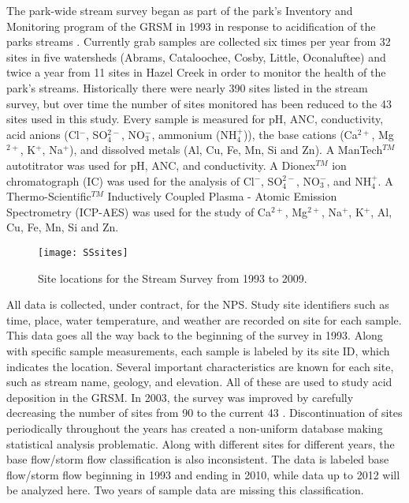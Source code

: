 The park-wide stream survey began as part of the park's Inventory and Monitoring program of the GRSM in 1993 in response to acidification of the parks streams \citep{harwell2001}.
Currently grab samples are collected six times per year from 32 sites in five watersheds (Abrams, Cataloochee, Cosby, Little, Oconaluftee) and twice a year from 11 sites in Hazel Creek in order to monitor the health of the park's streams.
Historically there were nearly 390 sites listed in the stream survey, but over time the number of sites monitored has been reduced to the 43 sites used in this study.
Every sample is  measured for pH, ANC, conductivity, acid anions (Cl$^-$, SO$_4^{2-}$, NO$_3^-$, ammonium (NH$_4^+$)), the base cations (Ca$^{2+}$, Mg$^{2+}$, K$^+$, Na$^+$), and dissolved metals (Al, Cu, Fe, Mn, Si and Zn).  
A ManTech$^{TM}$ autotitrator was used for pH, ANC, and conductivity.  
A Dionex$^{TM}$ ion chromatograph (IC) was used for the analysis of Cl$^-$, SO$_4^{2-}$, NO$_3^-$, and NH$_4^+$.  
A Thermo-Scientific$^{TM}$ Inductively Coupled Plasma - Atomic Emission Spectrometry (ICP-AES) was used for the study of Ca$^{2+}$, Mg$^{2+}$, Na$^+$, K$^+$, Al, Cu, Fe, Mn, Si and Zn.

\begin{figure}[h!]
  \centering
  \texttt{[image: SSsites]}\\
  \caption{Site locations for the Stream Survey from 1993 to 2009. }\label{fig:SSsites}
\end{figure}

All data is collected, under contract, for the NPS.
Study site identifiers such as time, place, water temperature, and weather are recorded on site for each sample.
This data goes all the way back to the beginning of the survey in 1993.
Along with specific sample measurements, each sample is labeled by its site ID, which indicates the location.
Several important characteristics are known for each site, such as stream name, geology, and elevation.
All of these are used to study acid deposition in the GRSM.
In 2003, the survey was improved by carefully decreasing the number of  sites from 90 to the current 43 \citep{odom2003}.
Discontinuation of sites periodically throughout the years has created a non-uniform database making statistical analysis problematic.
Along with different sites for different years, the base flow/storm flow classification is also inconsistent.
The data is labeled base flow/storm flow beginning in 1993 and ending in 2010, while data up to 2012 will be analyzed here.
Two years of sample data are missing this classification.

